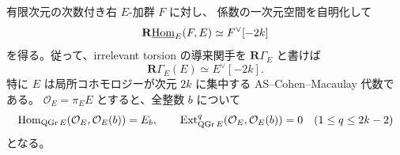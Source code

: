 \begin{lemma}[中心完全交叉の双対と低次切断]
\label{mbcr:lem:ci-cohomology}
有限次元の次数付き右 $E$-加群 $F$ に対し、
係数の一次元空間を自明化して
\begin{equation}\label{mbcr:eq:finite-duality}
 \mathbf R\underline{\operatorname{Hom}}_E(F,E)\simeq F^\vee[-2k]
\end{equation}
を得る。従って、irrelevant torsion の導来関手を
$\mathbf R\Gamma_E$ と書けば
\begin{equation}\label{mbcr:eq:ci-local-cohomology}
 \mathbf R\Gamma_E(E)\simeq E^\vee[-2k].
\end{equation}
特に $E$ は局所コホモロジーが次元 $2k$ に集中する
AS--Cohen--Macaulay 代数である。
$\mathcal O_E=\pi_EE$ とすると、全整数 $b$ について
\begin{equation}\label{mbcr:eq:ci-low-sections}
 \operatorname{Hom}_{\operatorname{QGr} E}(\mathcal O_E,\mathcal O_E(b))=E_b,\qquad
 \operatorname{Ext}^q_{\operatorname{QGr} E}(\mathcal O_E,\mathcal O_E(b))=0
 \quad(1\leq q\leq2k-2)
\end{equation}
となる。
\end{lemma}
